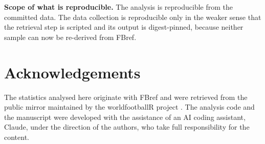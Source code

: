 \textbf{Scope of what is reproducible.} The analysis is reproducible from the committed
data. The data collection is reproducible only in the weaker sense that the retrieval step
is scripted and its output is digest-pinned, because neither sample can now be re-derived
from FBref.

\ifreview\else
\section*{Acknowledgements}

The statistics analysed here originate with FBref and were retrieved from the public
mirror maintained by the worldfootballR project \citep{zivkovic2026worldfootballr}. The
analysis code and the manuscript were developed with the assistance of an AI coding
assistant, Claude, under the direction of the authors, who take full responsibility for the
content.
\fi
